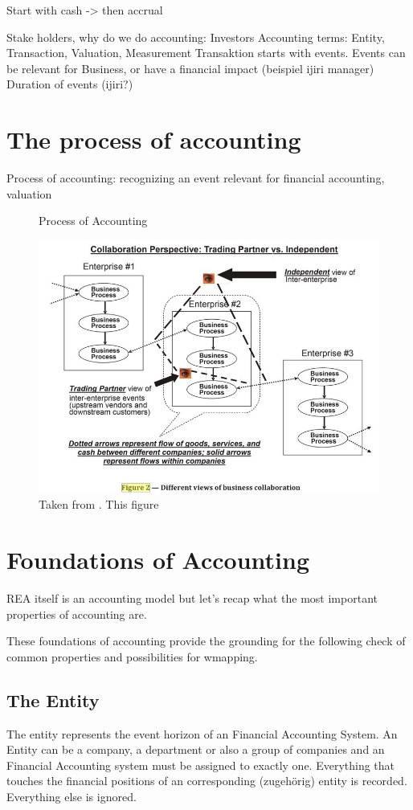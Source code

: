 Start with cash -> then accrual


Stake holders, why do we do accounting: Investors
Accounting terms: Entity, Transaction, Valuation, Measurement
Transaktion starts with events.
Events can be relevant for Business, or have a financial impact (beispiel ijiri manager)
Duration of events (ijiri?)

\section{The process of accounting}
Process of accounting: recognizing an event relevant for financial accounting, valuation

\begin{figure}
	\centering
	\caption{Process of Accounting}
	\label{fig:accounting-process}
	\includegraphics[width=0.7\linewidth]{"../figures/replace/CollaborativePerspective"}
	\caption*{Taken from \cite[p.3]{horngren2006introduction}. This figure }
\end{figure}


\section{Foundations of Accounting}
REA itself is an accounting model but let's recap what the most important
properties of accounting are. 

These foundations of accounting provide the grounding for the following check of common properties and possibilities for wmapping.

\subsection{The Entity}
The entity represents the event horizon of an Financial Accounting System.
An Entity can be a company, a department or also a group of companies and an Financial Accounting system must be assigned to exactly one.
Everything that touches the financial positions of an corresponding (zugehörig) entity is recorded.
Everything else is ignored.\cite[p.15]{Horngren1984}

